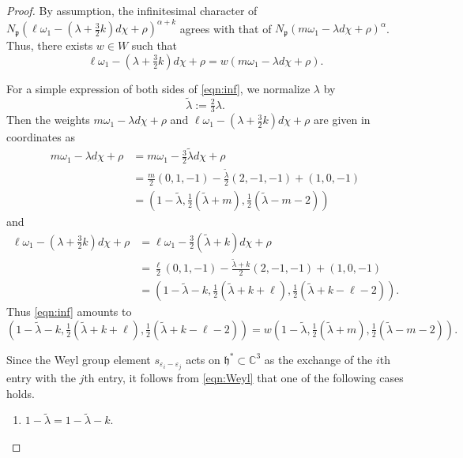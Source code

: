 \documentclass[10pt,a4paper]{amsart}
\newcommand{\C}{\mathbb{C}}
\newcommand{\eps}{\varepsilon}
\newcommand{\fh}{{\mathfrak h}}
\newcommand{\fp}{{\mathfrak p}}
\newcommand{\ga}{\alpha}
\newcommand{\wlambda}{\widetilde{\lambda}}
\begin{document}
\begin{proof}
By assumption,
the infinitesimal character of 
$N_\fp(\ell\omega_1 -(\lambda +\tfrac{3}{2}k)d\chi+\rho)^{\ga+k}$
agrees with that of $N_\fp(m\omega_1 -\lambda d\chi+\rho)^\ga$. 
Thus, there exists $w \in W$ such that
\begin{equation}\label{eqn:inf}
\ell\omega_1 -(\lambda +\tfrac{3}{2}k)d\chi+\rho
=w(m\omega_1 -\lambda d\chi+\rho).
\end{equation}

For a simple expression of both sides of \eqref{eqn:inf}, we normalize $\lambda$ by
\begin{equation*}
\wlambda:=\tfrac{2}{3}\lambda.
\end{equation*}
Then the weights $m\omega_1 -\lambda d\chi+\rho$ and 
$\ell\omega_1 -(\lambda +\tfrac{3}{2}k)d\chi+\rho$ are given in coordinates as
\begin{align*}
m\omega_1 -\lambda d\chi+\rho
&=m\omega_1 -\tfrac{3}{2}\wlambda d\chi+\rho\\
&=\tfrac{m}{2}(0, 1, -1) - \tfrac{\wlambda}{2}(2,-1,-1) + (1,0,-1)\\
&=
(1-\wlambda, \tfrac{1}{2}(\wlambda+m),\tfrac{1}{2}(\wlambda-m-2))
\end{align*}
and
\begin{align*}
\ell\omega_1 -(\lambda +\tfrac{3}{2}k)d\chi+\rho
&=\ell\omega_1 -\tfrac{3}{2}(\wlambda +k)d\chi+\rho\\
&=\tfrac{\ell}{2}(0,1,-1)-\tfrac{\wlambda+k}{2}(2,-1,-1)+(1,0,-1)\\
&=
(1-\wlambda-k, \tfrac{1}{2}(\wlambda+k+\ell), \tfrac{1}{2}(\wlambda+k-\ell-2)).
\end{align*}
Thus \eqref{eqn:inf}  amounts to
\begin{equation*}
(1-\wlambda-k, \tfrac{1}{2}(\wlambda+k+\ell), \tfrac{1}{2}(\wlambda+k-\ell-2))
=w(1-\wlambda, \tfrac{1}{2}(\wlambda+m),\tfrac{1}{2}(\wlambda-m-2)).
\end{equation*}

\noindent
Since the Weyl group element $s_{\eps_i-\eps_j}$ acts on $\fh^*\subset \C^3$
as the exchange of the $i$th entry with the $j$th entry, 
it follows from \eqref{eqn:Weyl} that one of the following cases holds.

\begin{enumerate}[(1)]

\item $1-\wlambda =1-\wlambda-k$.

\vskip 0.05in


\end{enumerate}
\end{proof}
\end{document}
